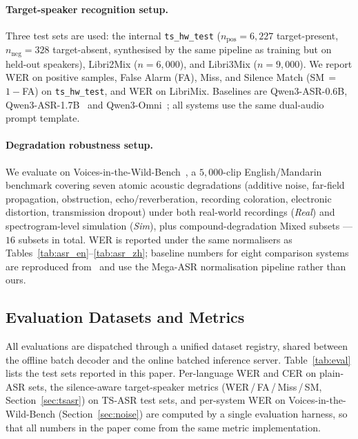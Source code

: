 \paragraph{Target-speaker recognition setup.}
Three test sets are used: the internal \texttt{ts\_hw\_test}
($n_\text{pos}\!=\!6{,}227$ target-present, $n_\text{neg}\!=\!328$
target-absent, synthesised by the same pipeline as training but on
held-out speakers), Libri2Mix ($n\!=\!6{,}000$), and Libri3Mix
($n\!=\!9{,}000$). We report WER on positive samples, False Alarm
(FA), Miss, and Silence Match (SM\,$=$\,$1\!-\!$FA) on
\texttt{ts\_hw\_test}, and WER on LibriMix. Baselines are
Qwen3-ASR-0.6B, Qwen3-ASR-1.7B~\cite{qwen2025qwen3asr} and
Qwen3-Omni~\cite{xu2025qwen25omni}; all systems use the same
dual-audio prompt template.

\paragraph{Degradation robustness setup.}
\label{subsec:vitw-protocol}
We evaluate on Voices-in-the-Wild-Bench~\cite{xie2026mega}, a
$5{,}000$-clip English/Mandarin benchmark covering seven atomic
acoustic degradations (additive noise, far-field propagation,
obstruction, echo/reverberation, recording coloration, electronic
distortion, transmission dropout) under both real-world recordings
(\emph{Real}) and spectrogram-level simulation (\emph{Sim}), plus
compound-degradation Mixed subsets --- $16$ subsets in total. WER
is reported under the same normalisers as
Tables~\ref{tab:asr_en}--\ref{tab:asr_zh}; baseline numbers for
eight comparison systems are reproduced from~\cite{xie2026mega}
and use the Mega-ASR normalisation pipeline rather than ours.

\subsection{Evaluation Datasets and Metrics}
\label{subsec:eval-data}

All evaluations are dispatched through a unified dataset registry,
shared between the offline batch decoder and the online batched
inference server. Table~\ref{tab:eval} lists the test sets
reported in this paper. Per-language WER and CER on plain-ASR
sets, the silence-aware target-speaker metrics
(WER\,/\,FA\,/\,Miss\,/\,SM, Section~\ref{sec:tsasr}) on TS-ASR
test sets, and per-system WER on Voices-in-the-Wild-Bench
(Section~\ref{sec:noise}) are computed by a single evaluation
harness, so that all numbers in the paper come from the same
metric implementation.

